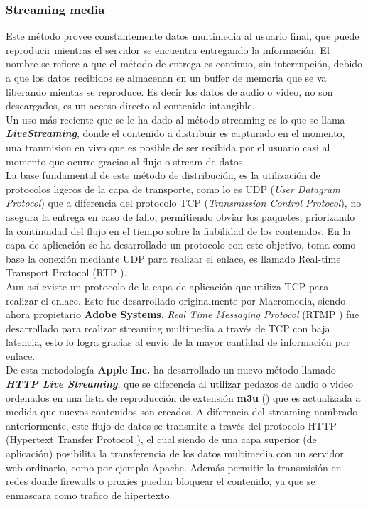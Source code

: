 \subsubsection{Streaming media}
Este método provee constantemente datos multimedia al usuario final, que puede reproducir mientras el servidor se encuentra entregando la información.
El nombre se refiere a que el método de entrega es continuo, sin interrupción, debido a que los datos recibidos se almacenan en un buffer de memoria que se va liberando mientas se reproduce. Es decir los datos de audio o video, no son descargados,  es un acceso directo al contenido intangible.\\

Un uso más reciente que se le ha dado al método streaming es lo que se llama \textbf{\textit{LiveStreaming}}, donde el contenido a distribuir es capturado en el momento, una tranmision en vivo que es posible de ser recibida por el usuario casi al momento que ocurre gracias al flujo o stream de datos.\\

La base fundamental de este método de distribución, es la utilización de protocolos ligeros de la capa de transporte, como lo es UDP (\textit{User Datagram Protocol}) que a diferencia del protocolo TCP (\textit{Transmission Control Protocol}), no asegura la entrega en caso de fallo, permitiendo obviar los paquetes, priorizando la continuidad del flujo en el tiempo sobre la fiabilidad de los contenidos.  En la capa de aplicación se ha desarrollado un protocolo con este objetivo, toma como base la conexión mediante UDP para realizar el enlace, es llamado Real-time Transport Protocol (RTP \cite{sota:rtp-draft}).\\

Aun así existe un protocolo de la capa de aplicación que utiliza TCP para realizar el enlace. Este fue desarrollado originalmente por Macromedia, siendo ahora propietario \textbf{Adobe Systems}. \textit{Real Time Messaging Protocol} (RTMP \cite{bib:rtmp-specs}) fue desarrollado para realizar streaming multimedia a través de TCP con baja latencia, esto lo logra gracias al envío de la mayor cantidad de información por enlace. \\
	
	De esta metodología \textbf{Apple Inc.} ha desarrollado un nuevo método llamado \textit{\textbf{HTTP Live Streaming}}, que se diferencia al utilizar pedazos de audio o video  ordenados en una lista de reproducción de extensión \textbf{m3u} (\cite{sota:m3u-specs}) que es actualizada a medida que nuevos contenidos son creados. A diferencia del streaming nombrado anteriormente, este flujo de datos se transmite a través del protocolo HTTP (Hypertext Transfer Protocol \cite{sota:rfc-http}), el cual siendo de una capa superior (de aplicación) posibilita la transferencia de los datos multimedia con un servidor web ordinario, como por ejemplo Apache. Además permitir la transmisión en redes donde firewalls o proxies puedan bloquear el contenido, ya que se enmascara como trafico de hipertexto.


